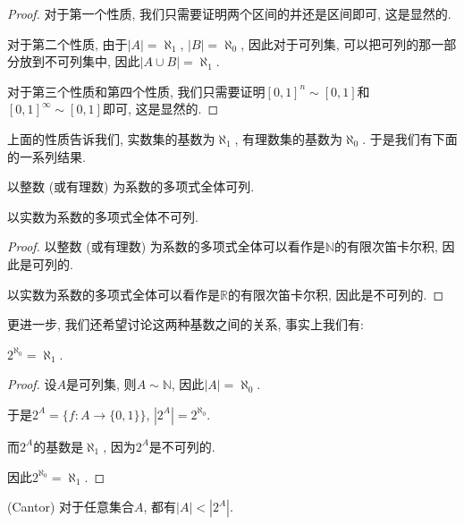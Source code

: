 \documentclass[theorem=false,mathfont=none,openany,sub3section]{easybook}
\begin{document}
\begin{proof}
  对于第一个性质, 我们只需要证明两个区间的并还是区间即可, 这是显然的.\par
  对于第二个性质, 由于$|A|=\aleph_{1}$, $|B|=\aleph_{0}$, 因此对于可列集, 可以把可列的那一部分放到不可列集中, 因此$|A\cup B|=\aleph_{1}$.\par
  对于第三个性质和第四个性质, 我们只需要证明$[0,1]^{n}\sim [0,1]$和$[0,1]^{\infty}\sim [0,1]$即可, 这是显然的.\par
\end{proof}

上面的性质告诉我们, 实数集的基数为$\aleph_{1}$, 有理数集的基数为$\aleph_{0}$. 于是我们有下面的一系列结果.\par

\begin{corollary}
  以整数 (或有理数) 为系数的多项式全体可列.\par
  以实数为系数的多项式全体不可列.\par
\end{corollary}

\begin{proof}
  以整数 (或有理数) 为系数的多项式全体可以看作是$\mathbb{N}$的有限次笛卡尔积, 因此是可列的.\par
  以实数为系数的多项式全体可以看作是$\mathbb{R}$的有限次笛卡尔积, 因此是不可列的.\par
\end{proof}

更进一步, 我们还希望讨论这两种基数之间的关系, 事实上我们有:\par

\begin{theorem}
  $2^{\aleph_{0}}=\aleph_{1}$.\par
\end{theorem}

\begin{proof}
  设$A$是可列集, 则$A\sim \mathbb{N}$, 因此$|A|=\aleph_{0}$.\par
  于是$2^{A}=\{f:A\to \{0,1\}\}$, $|2^{A}|=2^{\aleph_{0}}$.\par
  而$2^{A}$的基数是$\aleph_{1}$, 因为$2^{A}$是不可列的.\par
  因此$2^{\aleph_{0}}=\aleph_{1}$.\par
\end{proof}

\begin{theorem}
  (Cantor) 对于任意集合$A$, 都有$|A|<|2^{A}|$.\par
\end{theorem}
\end{document}
